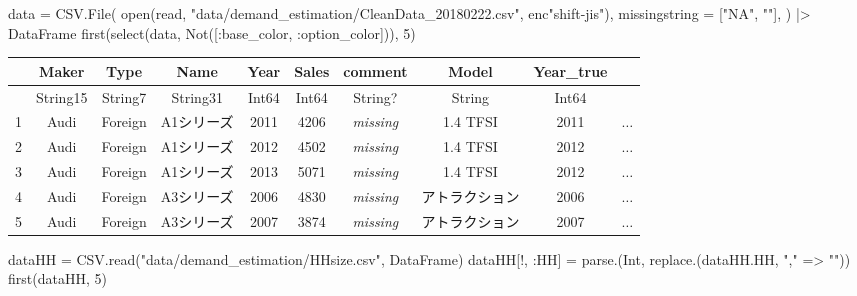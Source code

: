 \documentclass[
  letterpaper,
  DIV=11,
  numbers=noendperiod]{scrreprt}
\newenvironment{Shaded}{\begin{snugshade}}{\end{snugshade}}
\newcommand{\DataTypeTok}[1]{\textcolor[rgb]{0.68,0.00,0.00}{#1}}
\newcommand{\FloatTok}[1]{\textcolor[rgb]{0.68,0.00,0.00}{#1}}
\newcommand{\FunctionTok}[1]{\textcolor[rgb]{0.28,0.35,0.67}{#1}}
\newcommand{\NormalTok}[1]{\textcolor[rgb]{0.00,0.23,0.31}{#1}}
\newcommand{\OperatorTok}[1]{\textcolor[rgb]{0.37,0.37,0.37}{#1}}
\newcommand{\StringTok}[1]{\textcolor[rgb]{0.13,0.47,0.30}{#1}}
\begin{document}
\begin{Shaded}
\begin{Highlighting}[]
\NormalTok{data }\OperatorTok{=}\NormalTok{ CSV.}\FunctionTok{File}\NormalTok{(}
    \FunctionTok{open}\NormalTok{(read, }\StringTok{"data/demand\_estimation/CleanData\_20180222.csv"}\NormalTok{, enc}\StringTok{"shift{-}jis"}\NormalTok{),}
\NormalTok{    missingstring }\OperatorTok{=}\NormalTok{ [}\StringTok{"NA"}\NormalTok{, }\StringTok{""}\NormalTok{],}
\NormalTok{    ) }\OperatorTok{|\textgreater{}}\NormalTok{ DataFrame}
\FunctionTok{first}\NormalTok{(}\FunctionTok{select}\NormalTok{(data, }\FunctionTok{Not}\NormalTok{([}\OperatorTok{:}\NormalTok{base\_color, }\OperatorTok{:}\NormalTok{option\_color])), }\FloatTok{5}\NormalTok{)}
\end{Highlighting}
\end{Shaded}

\begin{tabular}{r|ccccccccc}
    & Maker & Type & Name & Year & Sales & comment & Model & Year\_true & \\
    \hline
    & String15 & String7 & String31 & Int64 & Int64 & String? & String & Int64 & \\
    \hline
    1 & Audi & Foreign & A1シリーズ & 2011 & 4206 & \emph{missing} & 1.4 TFSI & 2011 & $\dots$ \\
    2 & Audi & Foreign & A1シリーズ & 2012 & 4502 & \emph{missing} & 1.4 TFSI & 2012 & $\dots$ \\
    3 & Audi & Foreign & A1シリーズ & 2013 & 5071 & \emph{missing} & 1.4 TFSI & 2012 & $\dots$ \\
    4 & Audi & Foreign & A3シリーズ & 2006 & 4830 & \emph{missing} & アトラクション & 2006 & $\dots$ \\
    5 & Audi & Foreign & A3シリーズ & 2007 & 3874 & \emph{missing} & アトラクション & 2007 & $\dots$ \\
\end{tabular}

\begin{Shaded}
\begin{Highlighting}[]
\NormalTok{dataHH }\OperatorTok{=}\NormalTok{ CSV.}\FunctionTok{read}\NormalTok{(}\StringTok{"data/demand\_estimation/HHsize.csv"}\NormalTok{, DataFrame)}
\NormalTok{dataHH[!, }\OperatorTok{:}\NormalTok{HH] }\OperatorTok{=} \FunctionTok{parse}\NormalTok{.(}\DataTypeTok{Int}\NormalTok{, }\FunctionTok{replace}\NormalTok{.(dataHH.HH, }\StringTok{","} \OperatorTok{=\textgreater{}} \StringTok{""}\NormalTok{))}
\FunctionTok{first}\NormalTok{(dataHH, }\FloatTok{5}\NormalTok{)}
\end{Highlighting}
\end{Shaded}
\end{document}

